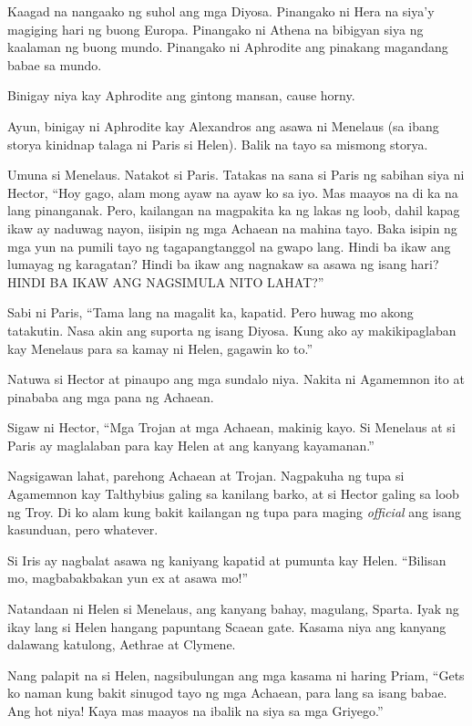 \documentclass[12pt,letterpaper]{report}
\begin{document}
Kaagad na nangaako ng suhol ang mga Diyosa. Pinangako ni Hera na siya'y magiging hari ng buong Europa. Pinangako ni Athena na bibigyan siya ng kaalaman ng buong mundo. Pinangako ni Aphrodite ang pinakang magandang babae sa mundo.

Binigay niya kay Aphrodite ang gintong mansan, cause horny.

Ayun, binigay ni Aphrodite kay Alexandros ang asawa ni Menelaus (sa ibang storya kinidnap talaga ni Paris si Helen). Balik na tayo sa mismong storya.

Umuna si Menelaus. Natakot si Paris. Tatakas na sana si Paris ng sabihan siya ni Hector, ``Hoy gago, alam mong ayaw na ayaw ko sa iyo. Mas maayos na di ka na lang pinanganak. Pero, kailangan na magpakita ka ng lakas ng loob, dahil kapag ikaw ay naduwag nayon, iisipin ng mga Achaean na mahina tayo. Baka isipin ng mga yun na pumili tayo ng tagapangtanggol na gwapo lang. Hindi ba ikaw ang lumayag ng karagatan? Hindi ba ikaw ang nagnakaw sa asawa ng isang hari? HINDI BA IKAW ANG NAGSIMULA NITO LAHAT?''

Sabi ni Paris, ``Tama lang na magalit ka, kapatid. Pero huwag mo akong tatakutin. Nasa akin ang suporta ng isang Diyosa. Kung ako ay makikipaglaban kay Menelaus para sa kamay ni Helen, gagawin ko to.''

Natuwa si Hector at pinaupo ang mga sundalo niya. Nakita ni Agamemnon ito at pinababa ang mga pana ng Achaean.

Sigaw ni Hector, ``Mga Trojan at mga Achaean, makinig kayo. Si Menelaus at si Paris ay maglalaban para kay Helen at ang kanyang kayamanan.''

Nagsigawan lahat, parehong Achaean at Trojan. Nagpakuha ng tupa si Agamemnon kay Talthybius galing sa kanilang barko, at si Hector galing sa loob ng Troy. Di ko alam kung bakit kailangan ng tupa para maging \textit{official} ang isang kasunduan, pero whatever.

Si Iris ay nagbalat asawa ng kaniyang kapatid at pumunta kay Helen. ``Bilisan mo, magbabakbakan yun ex at asawa mo!''

Natandaan ni Helen si Menelaus, ang kanyang bahay, magulang, Sparta. Iyak ng ikay lang si Helen hangang papuntang Scaean gate. Kasama niya ang kanyang dalawang katulong, Aethrae at Clymene.

Nang palapit na si Helen, nagsibulungan ang mga kasama ni haring Priam, ``Gets ko naman kung bakit sinugod tayo ng mga Achaean, para lang sa isang babae. Ang hot niya! Kaya mas maayos na ibalik na siya sa mga Griyego.''
\end{document}
